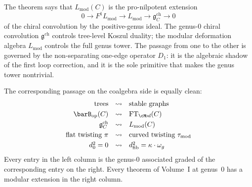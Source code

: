 \begin{remark}
\label{rem:genus-completion-meaning}
The theorem says that $L_{\mathrm{mod}}(C)$ is the
pro-nilpotent extension
\[
0 \longrightarrow F^1 L_{\mathrm{mod}}
\longrightarrow L_{\mathrm{mod}}
\longrightarrow \mathfrak{g}^{\mathrm{ch}}_C
\longrightarrow 0
\]
of the chiral convolution by the positive-genus ideal. The
genus-$0$ chiral convolution $\mathfrak{g}^{\mathrm{ch}}$ controls
tree-level Koszul duality; the modular deformation algebra
$L_{\mathrm{mod}}$ controls the full genus tower. The passage
from one to the other is governed by the non-separating one-edge
operator $D_1$: it is the algebraic shadow of the first loop
correction, and it is the sole primitive that makes the genus
tower nontrivial.

The corresponding passage on the coalgebra side is equally clean:
\[
\begin{array}{rcl}
\text{trees} & \rightsquigarrow & \text{stable graphs} \\[3pt]
\barB_{\mathrm{op}}(C)
 & \rightsquigarrow
 & \mathrm{FT}_{\cM\!od}(C) \\[3pt]
\mathfrak{g}^{\mathrm{ch}}_C
 & \rightsquigarrow
 & L_{\mathrm{mod}}(C) \\[3pt]
\text{flat twisting } \pi
 & \rightsquigarrow
 & \text{curved twisting } \tau_{\mathrm{mod}} \\[3pt]
d_0^2 = 0
 & \rightsquigarrow
 & d_{\mathrm{fib}}^2 = \kappa \cdot \omega_g
\end{array}
\]
Every entry in the left column is the genus-$0$ associated graded
of the corresponding entry on the right. Every theorem of
Volume~I at genus~$0$ has a modular extension in the right column.
\end{remark}

